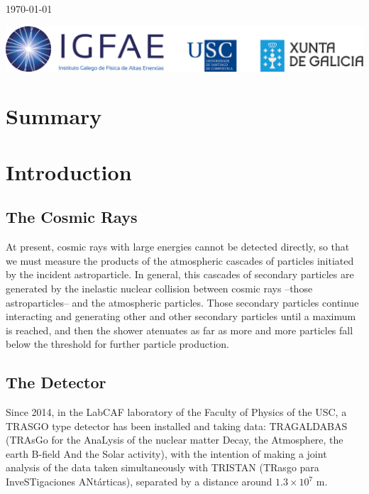 \documentclass[a4paper]{book}
\begin{document}
\begin{titlepage}
	\vfill


	{\large \today\par}
\end{titlepage}


\thispagestyle{empty}
\vfill
\includegraphics[scale=0.25]{LogoIGFAE}


\tableofcontents

\chapter{Summary}

\hspace{13pt} 


\chapter{Introduction}

\section{The Cosmic Rays}

At present, cosmic rays with large energies cannot be detected directly, so that we must measure the products of the atmospheric cascades of particles initiated by the incident astroparticle. In general, this cascades of secondary particles are generated by the inelastic nuclear collision between cosmic rays --those astroparticles-- and the atmospheric particles. Those secondary particles continue interacting and generating other and other secondary particles until a maximum is reached, and then the shower atenuates as far as more and more particles fall below the threshold for further particle production.

\section{The Detector}

Since 2014, in the LabCAF laboratory of the Faculty of Physics of the USC, a TRASGO type detector has been installed and taking data: TRAGALDABAS (TRAsGo for the AnaLysis of the nuclear matter Decay, the Atmosphere, the earth B-field And the Solar activity), with the intention of making a joint analysis of the data taken simultaneously with TRISTAN (TRasgo para InveSTigaciones ANtárticas), separated by a distance around $1.3 \times 10^7$ m.
\end{document}
